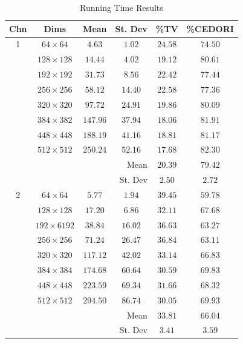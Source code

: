 \documentclass[a4paper,11pt]{ijamas}
\begin{document}
{
{\footnotesize
\begin{table}
\renewcommand{\arraystretch}{1.3}
\caption{Running Time Results}
\label{tab:results_runningtime}
\centering
\begin{tabular}{cccccc}
   \hline
Chn		& Dims 		& Mean	& St. Dev	& \%TV	& \%CEDORI \\ \hline
1 			& $64\times64$	& $4.63$	& $1.02$	& $24.58$& $74.50$\\
 			& $128\times128$	& $14.44$& $4.02$& $19.12$& $80.61$ \\
          	& $192\times192$	& $31.73$& $8.56$& $22.42$& $77.44$ \\
          	& $256\times256$	& $58.12$& $14.40$& $22.58$& $77.36$ \\
          	& $320\times320$	& $97.72$& $24.91$& $19.86$& $80.09$ \\
          	& $384\times382$	& $147.96$& $37.94$& $18.06$& $81.91$ \\
          	& $448\times448$	& $188.19$& $41.16$& $18.81$& $81.17$ \\
          	& $512\times512$	& $250.24$& $52.16$& $17.68$& $82.30$ \\
          	\hline
          	\multicolumn{4}{r}{Mean} & $20.39$ & $79.42$ \\
          	\multicolumn{4}{r}{St. Dev} & $2.50$ & $2.72$ \\
          	\hline
          	
2 		 	& $64\times64$	&$5.77$	 &$1.94$	 &$39.45$& $59.78$ \\
 			& $128\times128$	&$17.20$	 &$6.86$ &$32.11$& $67.68$ \\
          	& $192\times6192$&$38.84$	 &$16.02$&$36.63$& $63.27$ \\          			& $256\times256$	&$71.24$	 &$26.47$&$36.84$& $63.11$ \\
          	& $320\times320$ &$117.12$&$42.02$&$33.14$	& $66.83$ \\
          	& $384\times384$ &$174.68$&$60.64$&$30.59$	& $69.83$ \\
          	& $448\times448$ &$223.59$&$69.34$&$31.66$	& $68.32$ \\
          	& $512\times512$ &$294.50$&$86.74$&$30.05$	& $69.93$ \\
          	\hline
          	\multicolumn{4}{r}{Mean} & $33.81$ & $66.04$ \\
          	\multicolumn{4}{r}{St. Dev} & $3.41$ & $3.59$ \\
          	\hline
          	

\end{tabular}
\end{table}}}
\end{document}
